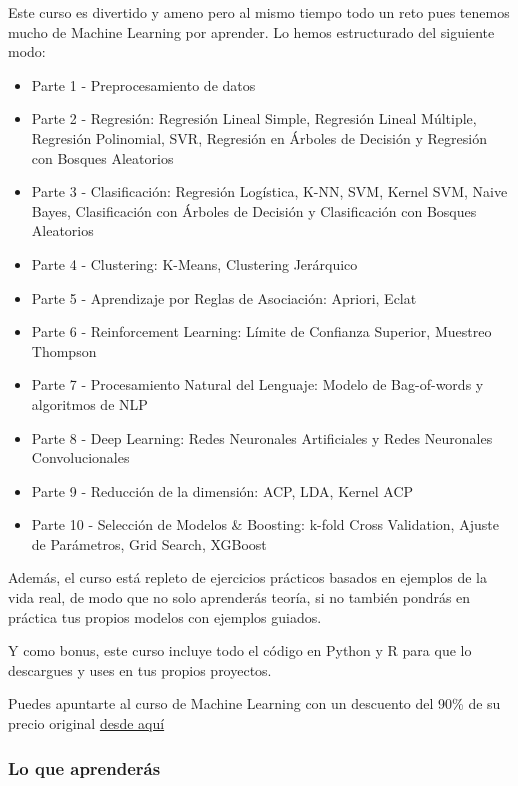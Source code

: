 \documentclass[]{article}
\providecommand{\tightlist}{%
  \setlength{\itemsep}{0pt}\setlength{\parskip}{0pt}}
\begin{document}
Este curso es divertido y ameno pero al mismo tiempo todo un reto pues
tenemos mucho de Machine Learning por aprender. Lo hemos estructurado
del siguiente modo:

\begin{itemize}
\tightlist
\item
  Parte 1 - Preprocesamiento de datos
\item
  Parte 2 - Regresión: Regresión Lineal Simple, Regresión Lineal
  Múltiple, Regresión Polinomial, SVR, Regresión en Árboles de Decisión
  y Regresión con Bosques Aleatorios
\item
  Parte 3 - Clasificación: Regresión Logística, K-NN, SVM, Kernel SVM,
  Naive Bayes, Clasificación con Árboles de Decisión y Clasificación con
  Bosques Aleatorios
\item
  Parte 4 - Clustering: K-Means, Clustering Jerárquico
\item
  Parte 5 - Aprendizaje por Reglas de Asociación: Apriori, Eclat
\item
  Parte 6 - Reinforcement Learning: Límite de Confianza Superior,
  Muestreo Thompson
\item
  Parte 7 - Procesamiento Natural del Lenguaje: Modelo de Bag-of-words y
  algoritmos de NLP
\item
  Parte 8 - Deep Learning: Redes Neuronales Artificiales y Redes
  Neuronales Convolucionales
\item
  Parte 9 - Reducción de la dimensión: ACP, LDA, Kernel ACP
\item
  Parte 10 - Selección de Modelos \& Boosting: k-fold Cross Validation,
  Ajuste de Parámetros, Grid Search, XGBoost
\end{itemize}

Además, el curso está repleto de ejercicios prácticos basados en
ejemplos de la vida real, de modo que no solo aprenderás teoría, si no
también pondrás en práctica tus propios modelos con ejemplos guiados.

Y como bonus, este curso incluye todo el código en Python y R para que
lo descargues y uses en tus propios proyectos.

Puedes apuntarte al curso de Machine Learning con un descuento del 90\%
de su precio original
\href{https://www.udemy.com/draft/2241862/?couponCode=GITHUB_PROMO_JB}{desde
aquí}

\hypertarget{lo-que-aprenderuxe1s}{%
\subsubsection{Lo que aprenderás}\label{lo-que-aprenderuxe1s}}
\end{document}
